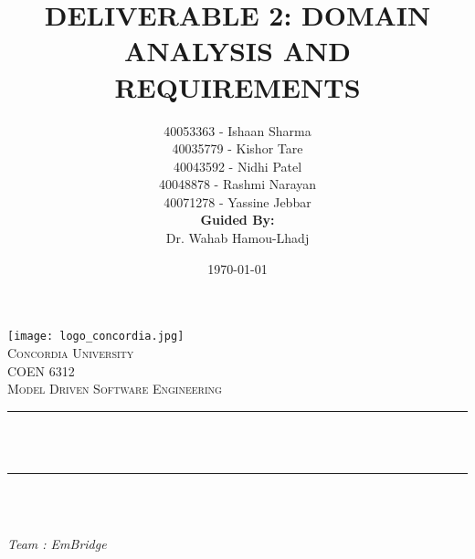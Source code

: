 \documentclass[12pt,a4paper]{article}
\title{DELIVERABLE 2: DOMAIN ANALYSIS AND REQUIREMENTS
		\\\vspace{.6cm}
	}								%
\author{
	 40053363 - Ishaan Sharma\\
	 40035779 - Kishor Tare\\
	 40043592 - Nidhi Patel\\
	 40048878 - Rashmi Narayan\\
     40071278 - Yassine Jebbar \\
     \newline\vspace{0.5 cm}
     \textbf{Guided By:}\\\qquad Dr. Wahab Hamou-Lhadj
	}								%
\date{\today}											%
\makeatletter
\let\thetitle\@title
\let\theauthor\@author
\let\thedate\@date
\makeatother
\begin{document}

\begin{titlepage}
	\centering
    \texttt{[image: logo\_concordia.jpg]}\\[1.0 cm]	%
    \textsc{\LARGE Concordia University}\\[2.0 cm]	%
	\textsc{\Large COEN 6312}\\[0.5 cm]				%
	\textsc{\large Model Driven Software Engineering}\\[0.5 cm]				%
	\rule{\linewidth}{0.2 mm} \\[0.4 cm]
	{ \huge \bfseries \thetitle}\\
	\rule{\linewidth}{0.2 mm} \\[1.5 cm]

		\begin{flushleft} \large\\[0.1 cm]
			\textit{Team : EmBridge}\\[0.5 cm]
		
			\theauthor
		\end{flushleft}
	\vspace{2cm}
    
	{\large \thedate}\\[2 cm]

	\vfill

\end{titlepage}

\thispagestyle{empty}

\tableofcontents
\begingroup
\let\clearpage\relax
\listoffigures
\begingroup
\let\clearpage\relax
\listoftables
\endgroup
\endgroup


\pagebreak

\end{document}
